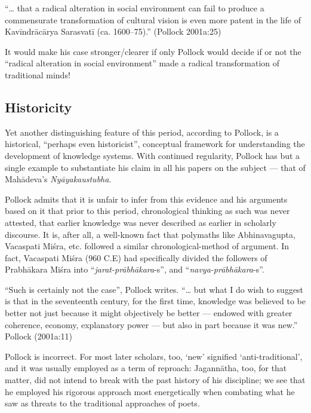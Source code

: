  “… that a radical alteration in social environment can fail to produce a commensurate transformation of cultural vision is even more patent in the life of Kavīndrācārya Sarasvatī (ca. 1600–75).” (Pollock 2001a:25)

It would make his case stronger/clearer if only Pollock would decide if or not the “radical alteration in social environment” made a radical transformation of traditional minds! 

\subsection{Historicity}%
Yet another distinguishing feature of this period, according to Pollock, is a historical, “perhaps even historicist”, conceptual framework for understanding the development of knowledge systems. With continued regularity, Pollock has but a single example to substantiate his claim in all his papers on the subject — that of Mahādeva’s {\sl Nyāyakaustubha}. 
\begin{myquote}
Pollock admits that it is unfair to infer from this evidence and his arguments based on it that prior to this period, chronological thinking as such was never attested, that earlier knowledge was never described as earlier in scholarly discourse. It is, after all, a well-known fact that polymaths like Abhinavagupta, Vacaspati Miśra, etc. followed a similar chronological-method of argument. In fact, Vacaspati Miśra (960 C.E) had specifically divided the followers of Prabhākara Miśra into “{\sl jarat-prābhākara}-s”, and “{\sl navya-prābhākara}-s”.  

“Such is certainly not the case”, Pollock writes. “… but what I do wish to suggest is that in the seventeenth century, for the first time, knowledge was believed to be better not just because it might objectively be better — endowed with greater coherence, economy, explanatory power — but also in part because it was new.”  \hfill{Pollock (2001a:11)}
\end{myquote}

Pollock is incorrect. For most later scholars, too, ‘new’ signified ‘anti-traditional’, and it was usually employed as a term of reproach: Jagannätha, too, for that matter, did not intend to break with the past history of his discipline; we see that he employed his rigorous approach most energetically when combating what he saw as threats to the traditional approaches of poets.

